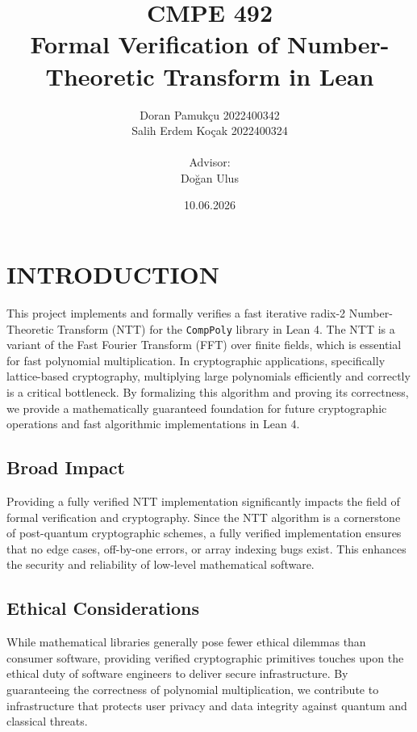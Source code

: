 \documentclass[a4paper,12pt]{report}
\begin{document}
\title{CMPE 492 \\ Formal Verification of Number-Theoretic Transform in Lean}
\author{
Doran Pamukçu 2022400342\\
Salih Erdem Koçak 2022400324\\ \\
Advisor: \\ 
Doğan Ulus
}
\date{10.06.2026}
\maketitle{}
\tableofcontents

\chapter{INTRODUCTION}
This project implements and formally verifies a fast iterative radix-2 Number-Theoretic Transform (NTT) for the \texttt{CompPoly} library in Lean 4. The NTT is a variant of the Fast Fourier Transform (FFT) over finite fields, which is essential for fast polynomial multiplication. In cryptographic applications, specifically lattice-based cryptography, multiplying large polynomials efficiently and correctly is a critical bottleneck. By formalizing this algorithm and proving its correctness, we provide a mathematically guaranteed foundation for future cryptographic operations and fast algorithmic implementations in Lean 4.

\section{Broad Impact}
Providing a fully verified NTT implementation significantly impacts the field of formal verification and cryptography. Since the NTT algorithm is a cornerstone of post-quantum cryptographic schemes, a fully verified implementation ensures that no edge cases, off-by-one errors, or array indexing bugs exist. This enhances the security and reliability of low-level mathematical software.

\section{Ethical Considerations}
While mathematical libraries generally pose fewer ethical dilemmas than consumer software, providing verified cryptographic primitives touches upon the ethical duty of software engineers to deliver secure infrastructure. By guaranteeing the correctness of polynomial multiplication, we contribute to infrastructure that protects user privacy and data integrity against quantum and classical threats.
\newpage
\end{document}
